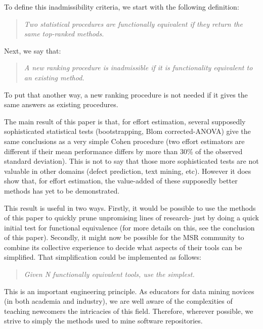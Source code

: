 \documentclass{sig-alternate}
\begin{document}
To define this inadmissibility criteria, we start with the following
definition:
\begin{quote}
{\em Two statistical procedures are {\em functionally
equivalent} if they return  the same top-ranked methods.}
\end{quote}
Next, we say that:
\begin{quote}
{\em  A new ranking procedure is inadmissible if it is {\em functionality
equivalent} to an existing method.}
\end{quote}
 To put that another way, a new ranking procedure
is not needed if it gives the same answers as existing procedures.

The main result of this paper is that, for effort
estimation, several supposedly
sophisticated statistical tests (bootstrapping, Blom corrected-ANOVA)
give the same conclusions as a very simple Cohen procedure
(two effort estimators are different if their mean performance
differs by more than 30\% of the observed standard deviation).
This is not to say that those more sophisticated tests
are not valuable in other domains (defect prediction,
text mining, etc). However
it does show  that, for effort estimation,
 the value-added
of these supposedly better methods
has yet to be demonstrated.

This result is useful in two ways. Firstly, 
 it would be possible
to use the methods of this paper to quickly prune
unpromising lines of research- just by doing a quick
initial test for functional equivalence (for more details
on this, see the conclusion of this paper). Secondly,
it
might now be possible for the MSR community to combine
its collective experience to 
decide
what aspects of their tools can be simplified.
That simplification could be implemented as follows:
\begin{quote}
{\em Given N functionally equivalent tools,  use the simplest.}
\end{quote}
This is an important engineering principle.  As educators
for data mining novices (in both academia and industry), we are well aware of the complexities of
teaching newcomers the intricacies of this field. Therefore, wherever possible,
we strive to simply the methods used to mine software repositories.
\end{document}
